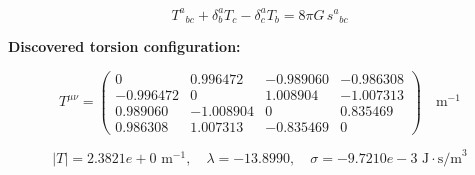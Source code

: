 
\begin{equation}
  T^a{}_{bc} + \delta^a_b T_c - \delta^a_c T_b = 8\pi G \, s^a{}_{bc}
\end{equation}

\textbf{Discovered torsion configuration:}

\begin{equation}
  T^{\mu\nu} = \begin{pmatrix}
    0 & 0.996472 & -0.989060 & -0.986308 \\
    -0.996472 & 0 & 1.008904 & -1.007313 \\
    0.989060 & -1.008904 & 0 & 0.835469 \\
    0.986308 & 1.007313 & -0.835469 & 0
  \end{pmatrix} \quad \text{m}^{-1}
\end{equation}

\begin{equation}
  |T| = 2.3821e+0 \text{ m}^{-1}, \quad
  \lambda = -13.8990, \quad
  \sigma = -9.7210e-3 \text{ J}\cdot\text{s/m}^3
\end{equation}